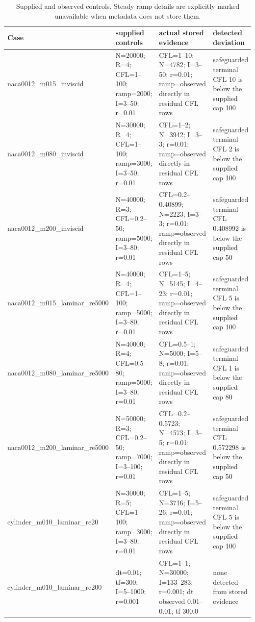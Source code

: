 \documentclass[11pt]{article}
\begin{document}
\begin{table}[htbp]\centering\scriptsize
\caption{Supplied and observed controls.  Steady ramp details are explicitly marked unavailable when metadata does not store them.}\label{tab:controls}
\begin{tabularx}{\linewidth}{lXXX}\toprule Case & supplied controls & actual stored evidence & detected deviation\\\midrule
naca0012\_m015\_inviscid & N=20000; R=4; CFL=1--100; ramp=2000; I=3--50; r=0.01 & CFL=1--10; N=4782; I=3--50; r=0.01; ramp=observed directly in residual CFL rows & safeguarded terminal CFL 10 is below the supplied cap 100 \\
naca0012\_m080\_inviscid & N=30000; R=4; CFL=1--100; ramp=3000; I=3--50; r=0.01 & CFL=1--2; N=3942; I=3--3; r=0.01; ramp=observed directly in residual CFL rows & safeguarded terminal CFL 2 is below the supplied cap 100 \\
naca0012\_m200\_inviscid & N=40000; R=3; CFL=0.2--50; ramp=5000; I=3--80; r=0.01 & CFL=0.2--0.40899; N=2223; I=3--3; r=0.01; ramp=observed directly in residual CFL rows & safeguarded terminal CFL 0.408992 is below the supplied cap 50 \\
naca0012\_m015\_laminar\_re5000 & N=40000; R=4; CFL=1--100; ramp=5000; I=3--80; r=0.01 & CFL=1--5; N=5145; I=4--23; r=0.01; ramp=observed directly in residual CFL rows & safeguarded terminal CFL 5 is below the supplied cap 100 \\
naca0012\_m080\_laminar\_re5000 & N=40000; R=4; CFL=0.5--80; ramp=5000; I=3--80; r=0.01 & CFL=0.5--1; N=5000; I=5--8; r=0.01; ramp=observed directly in residual CFL rows & safeguarded terminal CFL 1 is below the supplied cap 80 \\
naca0012\_m200\_laminar\_re5000 & N=50000; R=3; CFL=0.2--50; ramp=7000; I=3--100; r=0.01 & CFL=0.2--0.5723; N=4573; I=3--5; r=0.01; ramp=observed directly in residual CFL rows & safeguarded terminal CFL 0.572298 is below the supplied cap 50 \\
cylinder\_m010\_laminar\_re20 & N=30000; R=5; CFL=1--100; ramp=3000; I=3--80; r=0.01 & CFL=1--5; N=3716; I=5--26; r=0.01; ramp=observed directly in residual CFL rows & safeguarded terminal CFL 5 is below the supplied cap 100 \\
cylinder\_m010\_laminar\_re200 & dt=0.01; tf=300; I=5--1000; r=0.001 & CFL=1--1; N=30000; I=133--283; r=0.001; dt observed 0.01--0.01; tf 300.0 & none detected from stored evidence \\
\bottomrule\end{tabularx}\end{table}
\end{document}
